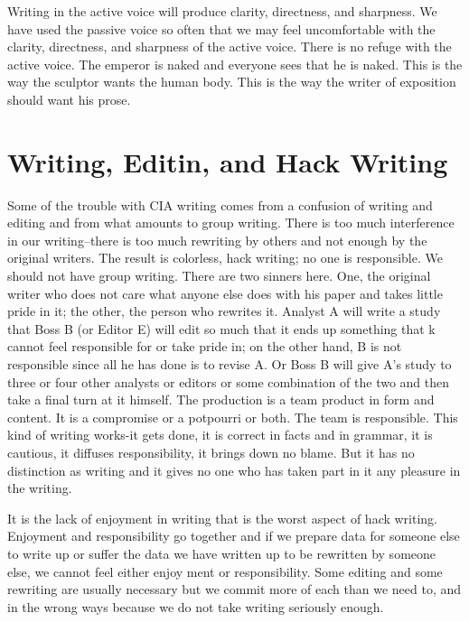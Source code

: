 \documentclass[
    oneside,
    11pt,
    draft
]{memoir}
\begin{document}
Writing in the active voice will produce clarity, directness, and sharpness. We have used the passive voice so often that we may feel uncomfortable with the clarity, directness, and sharpness of the active voice. There is no refuge with the active voice. The emperor is naked and everyone sees that he is naked. This is the way the sculptor wants the human body. This is the way the writer of exposition should want his prose.

\chapter{Writing, Editin, and Hack Writing}

Some of the trouble with CIA writing comes from a confusion of writing and editing and from what amounts to group writing. There is too much interference in our writing--there is too much rewriting by others and not enough by the original writers. The result is colorless, hack writing; no one is responsible. We should not have group writing. There are two sinners here. One, the original writer who does not care what anyone else does with his paper and takes little pride in it; the other, the person who rewrites it. Analyst A will write a study that Boss B (or Editor E) will edit so much that it ends up something that k cannot feel responsible for or take pride in; on the other hand, B is not responsible since all he has done is to revise A. Or Boss B will give A's study to three or four other analysts or editors or some combination of the two and then take a final turn at it himself. The production is a team product in form and content. It is a compromise or a potpourri or both. The team is responsible. This kind of writing works-it gets done, it is correct in facts and in grammar, it is cautious, it diffuses responsibility, it brings down no blame. But it has no distinction as writing and it gives no one who has taken part in it any pleasure in the writing. 

It is the lack of enjoyment in writing that is the worst aspect of hack writing. Enjoyment and responsibility go together and if we prepare data for someone else to write up or suffer the data we have written up to be rewritten by someone else, we cannot feel either enjoy ment or responsibility. Some editing and some rewriting are usually necessary but we commit more of each than we need to, and in the wrong ways because we do not take writing seriously enough. 
\end{document}
